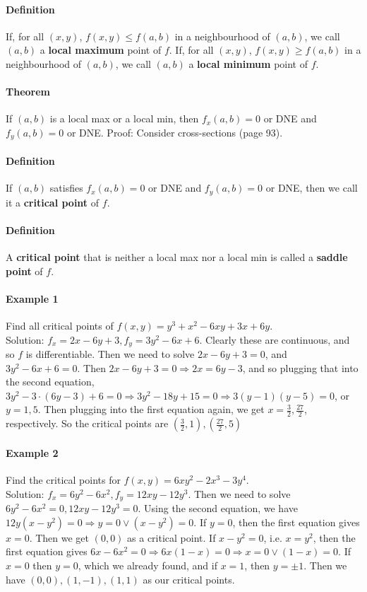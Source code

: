 \documentclass[tikz,10pt,letter]{article}
\theoremstyle{plain}
\theoremstyle{definition}
\begin{document}
\paragraph{Definition} If, for all $(x,y)$, $f(x,y)\leq f(a,b)$ in a neighbourhood of $(a,b)$, we call $(a,b)$ a \textbf{local maximum} point of $f$. If, for all $(x,y)$, $f(x,y)\geq f(a,b)$ in a neighbourhood of $(a,b)$, we call $(a,b)$ a \textbf{local minimum} point of $f$. 

\paragraph{Theorem} If $(a,b)$ is a local max or a local min, then $f_x(a,b)=0$ or DNE and $f_y(a,b)=0$ or DNE. Proof: Consider cross-sections (page 93). 

\paragraph{Definition} If $(a,b)$ satisfies $f_x(a,b)=0$ or DNE and $f_y(a,b)=0$ or DNE, then we call it a \textbf{critical point} of $f$. 
\paragraph{Definition} A \textbf{critical point} that is neither a local max nor a local min is called a \textbf{saddle point} of $f$. 
\paragraph{Example 1}
Find all critical points of $f(x,y)=y^3+x^2-6xy+3x+6y$. \\ 
Solution: $f_x=2x-6y+3,f_y=3y^2-6x+6$. Clearly these are continuous, and so $f$ is differentiable. Then we need to solve $2x-6y+3=0$, and $3y^2-6x+6=0$. Then $2x-6y+3=0\Rightarrow 2x=6y-3$, and so plugging that into the second equation, $3y^2-3\cdot(6y-3)+6=0\Rightarrow 3y^2-18y+15=0\Rightarrow 3(y-1)(y-5)=0$, or $y=1,5$. Then plugging into the first equation again, we get $x=\frac{3}{2},\frac{27}{2}$, respectively. So the critical points are $\left(\frac{3}{2},1\right), \left(\frac{27}{2},5\right)$

\paragraph{Example 2}
Find the critical points for $f(x,y)=6xy^2-2x^3-3y^4$. \\ 
Solution: $f_x=6y^2-6x^2, f_y=12xy-12y^3$. Then we need to solve $6y^2-6x^2=0, 12xy-12y^3=0$. Using the second equation, we have $12y(x-y^2)=0\Rightarrow y=0\vee(x-y^2)=0$. If $y=0$, then the first equation gives $x=0$. Then we get $(0,0)$ as a critical point. If $x-y^2=0$, i.e. $x=y^2$, then the first equation gives $6x-6x^2=0\Rightarrow 6x(1-x)=0\Rightarrow x=0\vee(1-x)=0$. If $x=0$ then $y=0$, which we already found, and if $x=1$, then $y=\pm1$. Then we have $(0,0),(1,-1),(1,1)$ as our critical points. 
\end{document}
